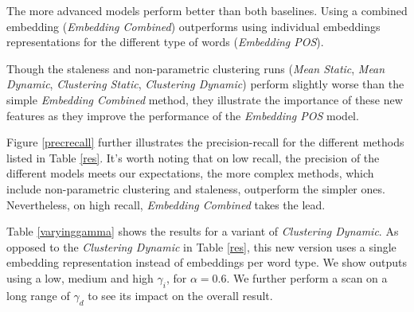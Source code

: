 \documentclass{article}
\begin{document}
The more advanced models perform better than both baselines. Using a combined embedding ({\textit{Embedding Combined}}) outperforms using individual embeddings representations for the different type of words ({\textit{Embedding POS}}).

Though the staleness and non-parametric clustering runs ({\textit{Mean Static}}, {\textit{Mean Dynamic}}, {\textit{Clustering Static}}, {\textit{Clustering Dynamic}}) perform slightly worse than the simple {\textit{Embedding Combined}} method, they illustrate the importance of these new features as they improve the performance of the {\textit{Embedding POS}} model.

Figure \ref{precrecall} further illustrates the precision-recall for the different methods listed in Table \ref{res}. It's worth noting that on low recall, the precision of the different models meets our expectations, the more complex methods, which include non-parametric clustering and staleness, outperform the simpler ones. Nevertheless, on high recall, {\textit{Embedding Combined}} takes the lead.

Table \ref{varyinggamma} shows the results for a variant of {\textit{Clustering Dynamic}}. As opposed to the {\textit{Clustering Dynamic}} in Table \ref{res}, this new version uses a single embedding representation instead of embeddings per word type. We show outputs using a low, medium and high $\gamma_i$, for $\alpha=0.6$. We further perform a scan on a long range of $\gamma_d$ to see its impact on the overall result. 
\end{document}

